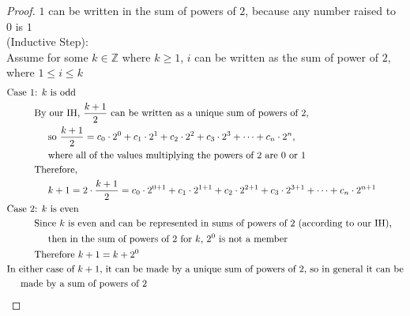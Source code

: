 \documentclass{article}
\begin{document}
\begin{enumerate}
\begin{proof}
        $1$ can be written in the sum of powers of $2$, because any number raised to $0$ is $1$ \\
        (Inductive Step): \\
        Assume for some $k \in \mathbb{Z}$ where $k \geq 1$, $i$ can be written as the sum of power of $2$, where $1 \leq i \leq k$ \\
        \begin{align}
            &\text{Case 1: } k \text{ is odd} \\
            &\hspace{1cm} \text{By our IH, } \frac{k+1}{2} \text{ can be written as a unique sum of powers of $2$,} \\
            &\hspace{1.5cm} \text{so } \frac{k+1}{2} = c_0 \cdot 2^0 + c_1 \cdot 2^1 + c_2 \cdot 2^2 + c_3 \cdot 2^3 + \dots + c_n \cdot 2^n \text{,} \\
            &\hspace{1.5cm} \text{where all of the values multiplying the powers of $2$ are $0$ or $1$} \\
            &\hspace{1cm} \text{Therefore, } \\
            &\hspace{1.5cm} k+1 = 2 \cdot \frac{k+1}{2} = c_0 \cdot 2^{0+1} + c_1 \cdot 2^{1+1} + c_2 \cdot 2^{2+1} + c_3 \cdot 2^{3+1} + \dots + c_n \cdot 2^{n+1} \\
            &\text{Case 2: } k \text{ is even} \\
            &\hspace{1cm} \text{Since } k \text{ is even and can be represented in sums of powers of $2$ (according to our IH),} \\
            &\hspace{1.5cm} \text{then in the sum of powers of } 2 \text{ for } k \text{, } 2^0 \text{ is not a member} \\
            &\hspace{1cm} \text{Therefore } k+1 = k + 2^0 \\
            &\text{In either case of } k+1 \text{, it can be made by a unique sum of powers of $2$, so in general it can be} \\
            &\hspace{.5cm} \text{made by a sum of powers of $2$}
        \end{align}
    \end{proof}
\end{enumerate}
\end{document}
